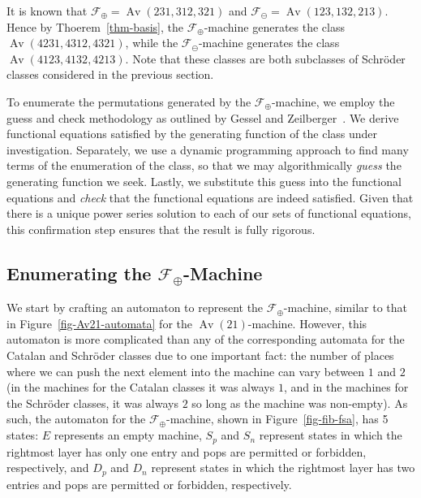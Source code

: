 \documentclass[10pt]{article}
\theoremstyle{plain}
\theoremstyle{definition}
\newcommand{\Av}{\operatorname{Av}}
\newcommand{\F}{\mathcal{F}}
\begin{document}
It is known that $\F_\oplus = \Av(231,312,321)$ and $\F_\ominus = \Av(123,132,213)$. Hence by Thoerem~\ref{thm-basis}, the $\F_\oplus$-machine generates the class $\Av(4231,4312,4321)$, while the $\F_\ominus$-machine generates the class $\Av(4123,4132,4213)$. Note that these classes are both subclasses of Schr\"oder classes considered in the previous section.

To enumerate the permutations generated by the $\F_\oplus$-machine, we employ the guess and check methodology as outlined by Gessel and Zeilberger~\cite{gessel:an-empirical-me:}. We derive functional equations satisfied by the generating function of the class under investigation. Separately, we use a dynamic programming approach to find many terms of the enumeration of the class, so that we may algorithmically \emph{guess} the generating function we seek. Lastly, we substitute this guess into the functional equations and \emph{check} that the functional equations are indeed satisfied. Given that there is a unique power series solution to each of our sets of functional equations, this confirmation step ensures that the result is fully rigorous.

\subsection{Enumerating the $\F_\oplus$-Machine}

We start by crafting an automaton to represent the $\F_\oplus$-machine, similar to that in Figure~\ref{fig-Av21-automata} for the $\Av(21)$-machine. However, this automaton is more complicated than any of the corresponding automata for the Catalan and Schr\"oder classes due to one important fact: the number of places where we can push the next element into the machine can vary between $1$ and $2$ (in the machines for the Catalan classes it was always $1$, and in the machines for the Schr\"oder classes, it was always $2$ so long as the machine was non-empty). As such, the automaton for the $\F_\oplus$-machine, shown in Figure~\ref{fig-fib-fsa}, has 5 states: $E$ represents an empty machine, $S_p$ and $S_n$ represent states in which the rightmost layer has only one entry and pops are permitted or forbidden, respectively, and $D_p$ and $D_n$ represent states in which the rightmost layer has two entries and pops are permitted or forbidden, respectively.

\end{document}
